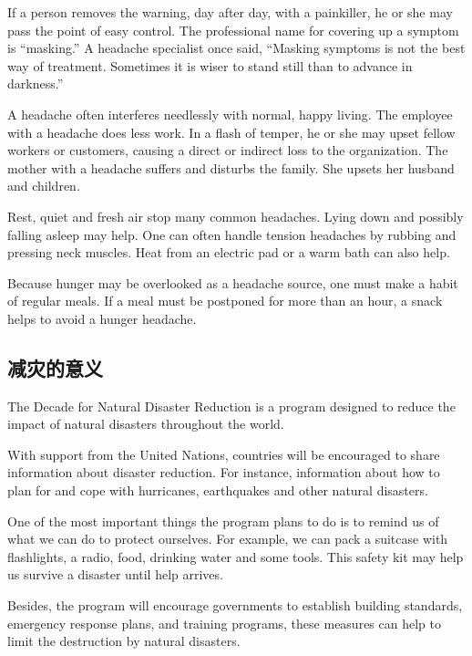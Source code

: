 If a person removes the warning, day after day, with a
painkiller, he or she may pass the point of easy control.
The professional name for covering up a symptom is
“masking.” A headache specialist once said, “Masking
symptoms is not the best way of treatment. Sometimes
it is wiser to stand still than to advance in darkness.”

A headache often interferes needlessly with normal,
happy living. The employee with a headache does less
work. In a flash of temper, he or she may upset fellow
workers or customers, causing a direct or indirect loss to
the organization. The mother with a headache suffers and
disturbs the family. She upsets her husband and children.

Rest, quiet and fresh air stop many common headaches.
Lying down and possibly falling asleep may help.
One can often handle tension headaches by rubbing and
pressing neck muscles. Heat from an electric pad or a
warm bath can also help.

Because hunger may be overlooked as a headache
source, one must make a habit of regular meals. If a meal
must be postponed for more than an hour, a snack helps
to avoid a hunger headache.



\subsection{减灾的意义}
\begin{margintable}\vspace{-2cm}\footnotesize
\end{margintable}
The Decade for Natural Disaster Reduction is a program
designed to reduce the impact of natural disasters
throughout the world.

With support from the United Nations, countries will be encouraged
to share information about disaster reduction.
For instance, information about how to plan for and cope
with hurricanes, earthquakes and other natural disasters.

One of the most important things the program plans to do
is to remind us of what we can do to protect ourselves. For
example, we can pack a suitcase with flashlights, a radio,
food, drinking water and some tools. This safety kit may
help us survive a disaster until help arrives.

Besides, the program will encourage governments to establish
building standards, emergency response plans,
and training programs, these measures can help to limit
the destruction by natural disasters.

